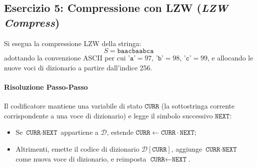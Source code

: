 \FloatBarrier
\subsection{Esercizio 5: Compressione con LZW (\textit{LZW Compress})}
\label{subsec:es5-lzw-compress}

\begin{example}
Si esegua la compressione LZW della stringa:
\begin{equation}
  S = \texttt{baacbaabca}
\end{equation}
adottando la convenzione ASCII per cui $\texttt{'a'} = 97$, $\texttt{'b'} = 98$, $\texttt{'c'} = 99$, e allocando le nuove voci di dizionario a partire dall'indice 256.
\end{example}

\paragraph{Risoluzione Passo-Passo}
Il codificatore mantiene una variabile di stato $\texttt{CURR}$ (la sottostringa corrente corrispondente a una voce di dizionario) e legge il simbolo successivo $\texttt{NEXT}$:
\begin{itemize}
  \item Se $\texttt{CURR} \cdot \texttt{NEXT}$ appartiene a $\mathcal{D}$, estende $\texttt{CURR} \leftarrow \texttt{CURR} \cdot \texttt{NEXT}$;
  \item Altrimenti, emette il codice di dizionario $\mathcal{D}[\texttt{CURR}]$, aggiunge $\texttt{CURR} \cdot \texttt{NEXT}$ come nuova voce di dizionario, e reimposta $\texttt{CURR} \leftarrow \texttt{NEXT}$.
\end{itemize}

